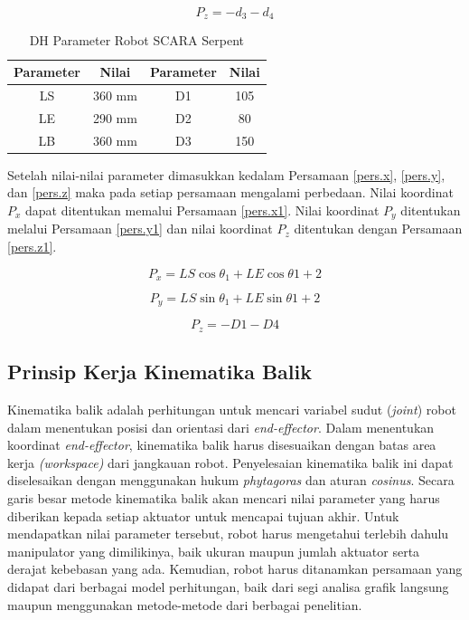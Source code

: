 \begin{equation}
P_{z}=-d_{3}-d_{4}
\label{pers.z}
\end{equation}

\begin{table}[H]
	\centering
	\caption{DH Parameter Robot SCARA Serpent}
	\label{tbl.konstanSCARA Serpent}
	\begin{tabular}{|c|c|c|c|}
		\hline
		\rowcolor[HTML]{9B9B9B} 
		Parameter & Nilai & Parameter & Nilai  \\ \hline
		LS    & 360 mm & D1      & 105          \\ \hline
		LE    & 290 mm &D2    & 80       \\ \hline
		LB    & 360 mm     & D3      &150    \\ \hline
		
	\end{tabular}
	
\end{table}

Setelah nilai-nilai parameter dimasukkan kedalam Persamaan \ref{pers.x}, \ref{pers.y}, dan \ref{pers.z} maka pada setiap persamaan mengalami perbedaan. Nilai koordinat $P_{x}$ dapat ditentukan memalui Persamaan \ref{pers.x1}. Nilai koordinat $P_{y}$ ditentukan melalui Persamaan \ref{pers.y1} dan nilai koordinat $P_{z}$ ditentukan dengan Persamaan \ref{pers.z1}.

\begin{equation}
P_{x}=LS\cos\theta_{1}+LE\cos\theta{1+2}
\label{pers.x1}
\end{equation}

\begin{equation}
P_{y}=LS\sin\theta_{1}+LE\sin\theta{1+2}
\label{pers.y1}
\end{equation}

\begin{equation}
P_{z}=-D1-D4
\label{pers.z1}
\end{equation}

\subsection{Prinsip Kerja Kinematika Balik}
Kinematika balik adalah perhitungan untuk mencari variabel sudut (\textit{joint}) robot dalam menentukan posisi dan orientasi dari \textit{end-effector}. Dalam menentukan koordinat \textit{end-effector}, kinematika balik harus disesuaikan dengan batas area kerja \textit{(workspace)} dari jangkauan robot. Penyelesaian kinematika balik ini dapat diselesaikan dengan menggunakan hukum \textit{phytagoras} dan aturan \textit{cosinus}. 
Secara garis besar metode kinematika balik akan mencari nilai parameter yang harus diberikan kepada setiap aktuator untuk mencapai tujuan akhir. Untuk mendapatkan nilai parameter tersebut, robot harus mengetahui terlebih dahulu manipulator yang dimilikinya, baik ukuran maupun jumlah aktuator serta derajat kebebasan yang ada. Kemudian, robot harus ditanamkan persamaan yang didapat dari berbagai model perhitungan, baik dari segi analisa grafik langsung maupun menggunakan metode-metode dari berbagai penelitian. 

